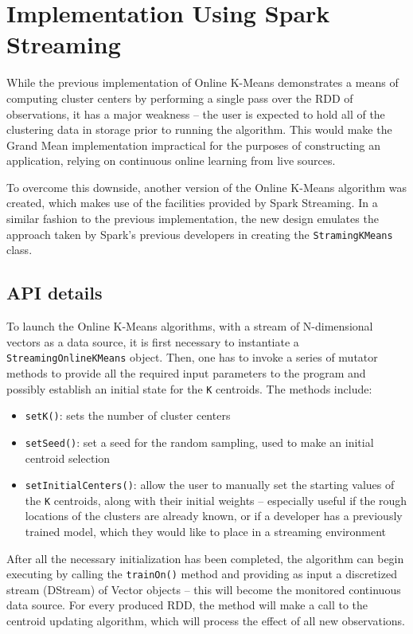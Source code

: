 \documentclass{l4proj}
\begin{document}
\section{Implementation Using Spark Streaming}

While the previous implementation of Online K-Means demonstrates a means of computing cluster centers by performing a single pass over the RDD of observations, it has a major weakness -- the user is expected to hold all of the clustering data in storage prior to running the algorithm. This would make the Grand Mean implementation impractical for the purposes of constructing an application, relying on continuous online learning from live sources. 

To overcome this downside, another version of the Online K-Means algorithm was created, which makes use of the facilities provided by Spark Streaming. In a similar fashion to the previous implementation, the new design emulates the approach taken by Spark's previous developers in creating the \texttt{StramingKMeans} class.

\subsection{API details}

To launch the Online K-Means algorithms, with a stream of N-dimensional vectors as a data source, it is first necessary to instantiate a \texttt{StreamingOnlineKMeans} object. Then, one has to invoke a series of mutator methods to provide all the required input parameters to the program and possibly establish an initial state for the \texttt{K} centroids. The methods include:

\begin{itemize}
\item \texttt{setK()}: sets the number of cluster centers
\item \texttt{setSeed()}: set a seed for the random sampling, used to make an initial centroid selection
\item \texttt{setInitialCenters()}: allow the user to manually set the starting values of the \texttt{K} centroids, along with their initial weights -- especially useful if the rough locations of the clusters are already known, or if a developer has a previously trained model, which they would like to place in a streaming environment 
\end{itemize}

After all the necessary initialization has been completed, the algorithm can begin executing by calling the \texttt{trainOn()} method and providing as input a discretized stream (DStream) of Vector objects -- this will become the monitored continuous data source. For every produced RDD, the method will make a call to the centroid updating algorithm, which will process the effect of all new observations. 
\end{document}
